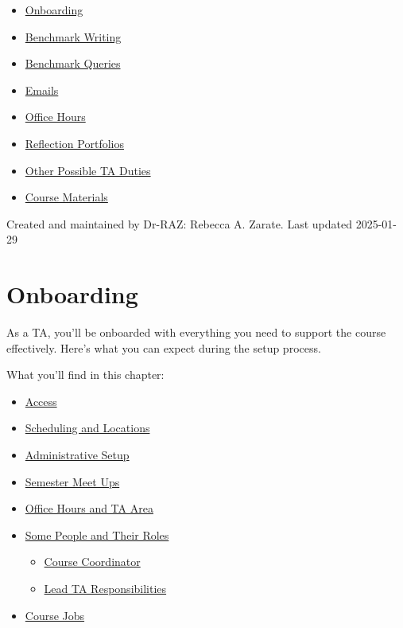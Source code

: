 \documentclass[
]{article}
\providecommand{\tightlist}{%
  \setlength{\itemsep}{0pt}\setlength{\parskip}{0pt}}
\begin{document}
\begin{itemize}
\tightlist
\item
  \protect\hyperlink{onboarding}{Onboarding}
\item
  \protect\hyperlink{benchmark-writing}{Benchmark Writing}
\item
  \protect\hyperlink{benchmark-queries}{Benchmark Queries}
\item
  \protect\hyperlink{emails}{Emails}
\item
  \protect\hyperlink{office-hours}{Office Hours}
\item
  \protect\hyperlink{reflection-portfolios}{Reflection Portfolios}
\item
  \protect\hyperlink{other-possible-ta-duties}{Other Possible TA Duties}
\item
  \protect\hyperlink{course-materials}{Course Materials}
\end{itemize}

Created and maintained by Dr-RAZ: Rebecca A. Zarate. Last updated 2025-01-29

\hypertarget{onboarding}{%
\section{Onboarding}\label{onboarding}}

As a TA, you'll be onboarded with everything you need to support the course effectively. Here's what you can expect during the setup process.

What you'll find in this chapter:

\begin{itemize}
\tightlist
\item
  \protect\hyperlink{access}{Access}
\item
  \protect\hyperlink{scheduling-and-locations}{Scheduling and Locations}
\item
  \protect\hyperlink{administrative-setup}{Administrative Setup}
\item
  \protect\hyperlink{semester-meet-ups}{Semester Meet Ups}
\item
  \protect\hyperlink{office-hours-and-ta-area}{Office Hours and TA Area}
\item
  \protect\hyperlink{some-people-and-their-roles}{Some People and Their Roles}

  \begin{itemize}
  \tightlist
  \item
    \protect\hyperlink{course-coordinator}{Course Coordinator}
  \item
    \protect\hyperlink{lead-ta-responsibilities}{Lead TA Responsibilities}
  \end{itemize}
\item
  \protect\hyperlink{course-jobs}{Course Jobs}
\end{itemize}
\end{document}
